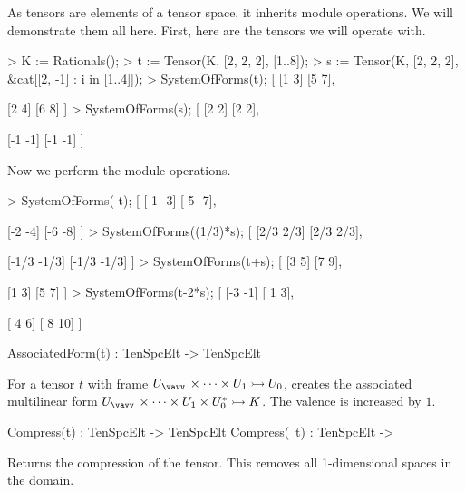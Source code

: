 \begin{example}[ModuleOperations]

As tensors are elements of a tensor space, it inherits module operations. 
We will demonstrate them all here.
First, here are the tensors we will operate with.
\begin{code}
> K := Rationals();
> t := Tensor(K, [2, 2, 2], [1..8]);
> s := Tensor(K, [2, 2, 2], &cat[[2, -1] : i in [1..4]]);
> SystemOfForms(t);
[
    [1 3]
    [5 7],

    [2 4]
    [6 8]
]
> SystemOfForms(s);
[
    [2 2]
    [2 2],

    [-1 -1]
    [-1 -1]
]
\end{code}

Now we perform the module operations.
\begin{code}
> SystemOfForms(-t);
[
    [-1 -3]
    [-5 -7],

    [-2 -4]
    [-6 -8]
]
> SystemOfForms((1/3)*s);
[
    [2/3 2/3]
    [2/3 2/3],

    [-1/3 -1/3]
    [-1/3 -1/3]
]
> SystemOfForms(t+s);
[
    [3 5]
    [7 9],

    [1 3]
    [5 7]
]
> SystemOfForms(t-2*s);
[
    [-3 -1]
    [ 1  3],

    [ 4  6]
    [ 8 10]
]
\end{code}
\end{example}

\begin{intrinsics}
AssociatedForm(t) : TenSpcElt -> TenSpcElt
\end{intrinsics}

For a tensor $t$ with frame $U_{\vav}\times \cdots \times U_1\rightarrowtail U_0$,
creates the associated multilinear form
$U_{\vav}\times\cdots\times U_1\times U_0^*\rightarrowtail K$. 
The valence is increased by $1$.

\begin{intrinsics}
Compress(t) : TenSpcElt -> TenSpcElt
Compress(~t) : TenSpcElt -> 
\end{intrinsics}

Returns the compression of the tensor. This removes all 1-dimensional spaces in the domain.

